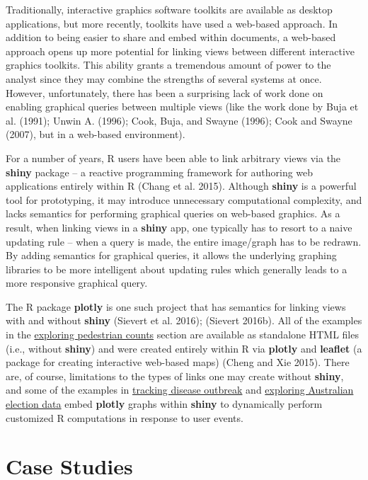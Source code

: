 \documentclass[12pt,]{article}
\theoremstyle{definition}
\theoremstyle{definition}
\theoremstyle{remark}
\begin{document}
Traditionally, interactive graphics software toolkits are available as
desktop applications, but more recently, toolkits have used a web-based
approach. In addition to being easier to share and embed within
documents, a web-based approach opens up more potential for linking
views between different interactive graphics toolkits. This ability
grants a tremendous amount of power to the analyst since they may
combine the strengths of several systems at once. However,
unfortunately, there has been a surprising lack of work done on enabling
graphical queries between multiple views (like the work done by Buja et
al. (1991); Unwin A. (1996); Cook, Buja, and Swayne (1996); Cook and
Swayne (2007), but in a web-based environment).

For a number of years, R users have been able to link arbitrary views
via the \textbf{shiny} package -- a reactive programming framework for
authoring web applications entirely within R (Chang et al. 2015).
Although \textbf{shiny} is a powerful tool for prototyping, it may
introduce unnecessary computational complexity, and lacks semantics for
performing graphical queries on web-based graphics. As a result, when
linking views in a \textbf{shiny} app, one typically has to resort to a
naive updating rule -- when a query is made, the entire image/graph has
to be redrawn. By adding semantics for graphical queries, it allows the
underlying graphing libraries to be more intelligent about updating
rules which generally leads to a more responsive graphical query.

The R package \textbf{plotly} is one such project that has semantics for
linking views with and without \textbf{shiny} (Sievert et al. 2016);
(Sievert 2016b). All of the examples in the
\protect\hyperlink{exploring-pedestrian-counts}{exploring pedestrian
counts} section are available as standalone HTML files (i.e., without
\textbf{shiny}) and were created entirely within R via \textbf{plotly}
and \textbf{leaflet} (a package for creating interactive web-based maps)
(Cheng and Xie 2015). There are, of course, limitations to the types of
links one may create without \textbf{shiny}, and some of the examples in
\protect\hyperlink{Tracking-disease-outbreak}{tracking disease outbreak}
and \protect\hyperlink{exploring-australian-election-data}{exploring
Australian election data} embed \textbf{plotly} graphs within
\textbf{shiny} to dynamically perform customized R computations in
response to user events.

\section{Case Studies}\label{case-studies}
\end{document}
